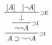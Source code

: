 \documentclass{article}
\begin{document}
\begin{displaymath}
\prftree[r]{$\scriptstyle\supset\mathrm{I}$}
{\prftree[r]{$\scriptstyle\supset\mathrm{I}$}
{\prftree[r]{$\scriptstyle\supset\mathrm{E}$}
{\prfboundedassumption{A}}
{\prfboundedassumption{\neg A}}
{\bot}}
{\neg\neg A}}
{A \supset \neg\neg A}
\end{displaymath}
\end{document}

